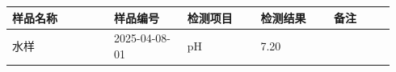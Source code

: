 \documentclass[UTF8,10pt,a4paper,fontset=fandol]{ctexart}
\newcommand{\fieldvalue}[1]{#1}
\newcommand{\handwritten}[1]{#1}
\begin{document}
\begin{tabular}{|p{0.25\linewidth}|p{0.18\linewidth}|p{0.18\linewidth}|p{0.18\linewidth}|p{0.15\linewidth}|}
\hline
样品名称 & 样品编号 & 检测项目 & 检测结果 & 备注 \\
\hline
\fieldvalue{\handwritten{水样}} &
\fieldvalue{\handwritten{2025-04-08-01}} &
\fieldvalue{\handwritten{pH}} &
\fieldvalue{\handwritten{7.20}} &
\\
\hline
\end{tabular}

\end{document}
